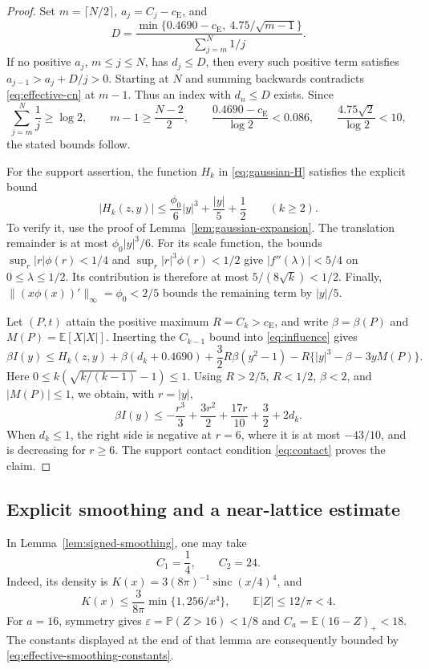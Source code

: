 \documentclass[aop]{imsart}
\theoremstyle{plain}
\theoremstyle{definition}
\theoremstyle{definition}
\newcommand{\PP}{\mathbb P}
\newcommand{\EE}{\mathbb E}
\newcommand{\ce}{c_{\mathrm E}}
\DeclareMathOperator{\sinc}{sinc}
\begin{document}
\begin{proof}
Set $m=\lceil N/2\rceil$, $a_j=C_j-\ce$, and
\[
 D=\frac{\min\{0.4690-\ce,\ 4.75/\sqrt{m-1}\}}
         {\sum_{j=m}^N1/j}.
\]
If no positive $a_j$, $m\le j\le N$, has $d_j\le D$, then every
such positive term satisfies $a_{j-1}>a_j+D/j>0$.  Starting at $N$
and summing backwards contradicts \eqref{eq:effective-cn} at $m-1$.
Thus an index with $d_n\le D$ exists.  Since
\[
 \sum_{j=m}^N\frac1j\ge\log2,\qquad
 m-1\ge\frac{N-2}{2},\qquad
 \frac{0.4690-\ce}{\log2}<0.086,\qquad
 \frac{4.75\sqrt2}{\log2}<10,
\]
the stated bounds follow.

For the support assertion, the function $H_k$ in
\eqref{eq:gaussian-H} satisfies the explicit bound
\begin{equation}\label{eq:effective-H-global}
 |H_k(z,y)|\le\frac{\phi_0}{6}|y|^3+\frac{|y|}{5}+\frac12
 \qquad(k\ge2).
\end{equation}
To verify it, use the proof of Lemma~\ref{lem:gaussian-expansion}.
The translation remainder is at most $\phi_0|y|^3/6$.
For its scale function, the bounds
$\sup_r|r|\phi(r)<1/4$ and $\sup_r|r|^3\phi(r)<1/2$ give
$|f''(\lambda)|<5/4$ on $0\le\lambda\le1/2$.  Its contribution is
therefore at most $5/(8\sqrt k)<1/2$.  Finally,
$\|(x\phi(x))'\|_\infty=\phi_0<2/5$ bounds the remaining term
by $|y|/5$.

Let $(P,t)$ attain the positive maximum $R=C_k>\ce$,
and write $\beta=\beta(P)$ and $M(P)=\EE[X|X|]$.  Inserting
the $C_{k-1}$ bound into \eqref{eq:influence} gives
\[
 \beta I(y)\le H_k(z,y)+\beta(d_k+0.4690)
 +\frac32R\beta(y^2-1)
 -R\{|y|^3-\beta-3yM(P)\}.
\]
Here $0\le k(\sqrt{k/(k-1)}-1)\le1$.
Using $R>2/5$, $R<1/2$, $\beta<2$, and $|M(P)|\le1$,
we obtain, with $r=|y|$,
\[
 \beta I(y)\le-\frac{r^3}{3}+\frac{3r^2}{2}
                    +\frac{17r}{10}+\frac32+2d_k.
\]
When $d_k\le1$, the right side is negative at $r=6$, where it
is at most $-43/10$, and is decreasing for $r\ge6$.
The support contact condition \eqref{eq:contact} proves the claim.
\end{proof}

\subsection{Explicit smoothing and a near-lattice estimate}

In Lemma~\ref{lem:signed-smoothing}, one may take
\begin{equation}\label{eq:effective-smoothing-constants}
 C_1=\frac14,\qquad C_2=24.
\end{equation}
Indeed, its density is
$K(x)=3(8\pi)^{-1}\sinc(x/4)^4$, and
\[
 K(x)\le\frac3{8\pi}\min\{1,256/x^4\},\qquad
 \EE|Z|\le12/\pi<4.
\]
For $a=16$, symmetry gives
$\varepsilon=\PP(Z>16)<1/8$ and
$C_a=\EE(16-Z)_+<18$.  The constants displayed at the end of
that lemma are consequently bounded by \eqref{eq:effective-smoothing-constants}.
\end{document}
